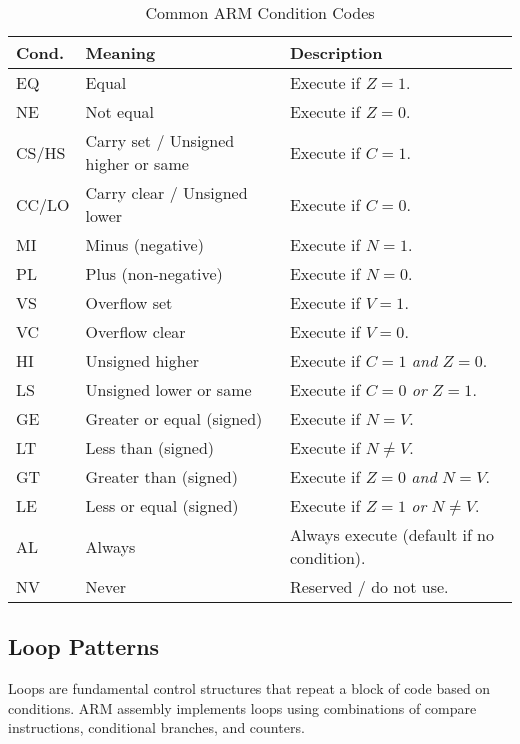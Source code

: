 \begin{table}[H]
\centering
\caption{Common ARM Condition Codes}
\small
\begin{tabularx}{0.72\linewidth}{@{}l l X@{}}
\toprule
\textbf{Cond.} & \textbf{Meaning} & \textbf{Description} \\
\midrule
EQ  & Equal                     & Execute if $Z=1$. \\
NE  & Not equal                 & Execute if $Z=0$. \\
CS/HS & Carry set / Unsigned higher or same & Execute if $C=1$. \\
CC/LO & Carry clear / Unsigned lower        & Execute if $C=0$. \\
MI  & Minus (negative)          & Execute if $N=1$. \\
PL  & Plus (non-negative)       & Execute if $N=0$. \\
VS  & Overflow set              & Execute if $V=1$. \\
VC  & Overflow clear            & Execute if $V=0$. \\
HI  & Unsigned higher           & Execute if $C=1$ \emph{and} $Z=0$. \\
LS  & Unsigned lower or same    & Execute if $C=0$ \emph{or} $Z=1$. \\
GE  & Greater or equal (signed) & Execute if $N=V$. \\
LT  & Less than (signed)        & Execute if $N\neq V$. \\
GT  & Greater than (signed)     & Execute if $Z=0$ \emph{and} $N=V$. \\
LE  & Less or equal (signed)    & Execute if $Z=1$ \emph{or} $N\neq V$. \\
AL  & Always                    & Always execute (default if no condition). \\
NV  & Never                     & Reserved / do not use. \\
\bottomrule
\end{tabularx}
\end{table}

\subsection{Loop Patterns}
Loops are fundamental control structures that repeat a block of code based on conditions. ARM assembly implements loops using combinations of compare instructions, conditional branches, and counters.

